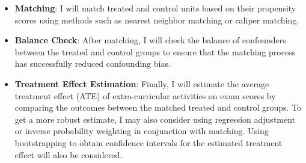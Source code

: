 \documentclass[11pt]{article}
\begin{document}
\begin{enumerate}
\begin{itemize}
    \item \textbf{Matching}: I will match treated and control units based on their propensity scores using methods such as nearest neighbor matching or caliper matching.
    
    \item \textbf{Balance Check}: After matching, I will check the balance of confounders between the treated and control groups to ensure that the matching process has successfully reduced confounding bias.
    
    \item \textbf{Treatment Effect Estimation}: Finally, I will estimate the average treatment effect (ATE) of extra-curricular activities on exam scores by comparing the outcomes between the matched treated and control groups. To get a more robust estimate, I may also consider using regression adjustment or inverse probability weighting in conjunction with matching. Using bootstrapping to obtain confidence intervals for the estimated treatment effect will also be considered.
    

\end{itemize}

\end{enumerate}





\end{document}
